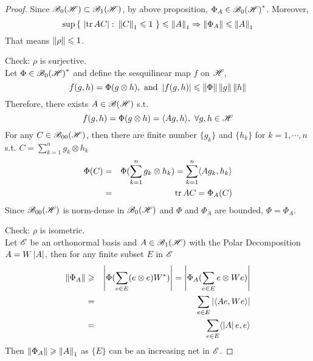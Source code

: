 \documentclass[a4paper,11pt]{report}
\begin{document}
\begin{proof}
	Since $\mathscr{B}_{0}\mathscr{(H)} \subset \mathscr{B}_{1}\mathscr{(H)}$, by above proposition, $\Phi_A \in \mathscr{B}_{0}\mathscr{(H)}^{*}$. Moreover, 
	\begin{equation*}
		\sup{\{~\left\lvert\operatorname{tr}{AC}\right\lvert \colon \left\lVert C\right\lVert_1 \leqslant 1~\}} \leqslant \left\lVert A\right\lVert_1 \Rightarrow  \left\lVert\Phi_A\right\lVert \leqslant \left\lVert A\right\lVert_1
	\end{equation*}
	That means $\left\lVert\rho\right\lVert \leqslant 1$.
	\item Check: $\rho$ is surjective.\\
	Let $\Phi \in \mathscr{B}_{0}\mathscr{(H)}^{*}$ and define the sesquilinear map $f$ on $\mathscr{H}$,
	\begin{equation*}
		f(g,h) = \Phi(g \otimes h), \text{ and } \left\lvert f(g,h)\right\lvert \leqslant \left\lVert\Phi\right\lVert\left\lVert g\right\lVert\left\lVert h\right\lVert
	\end{equation*}
	Therefore, there exists $A \in \mathscr{B(H)}$ s.t.
	\begin{equation*}
		f(g,h) = \Phi(g \otimes h) = \langle Ag, h \rangle,~\forall g,h \in \mathscr{H}
	\end{equation*}
	For any $C \in \mathscr{B}_{00}\mathscr{(H)}$, then there are finite number $\{g_k\}$ and $\{h_k\}$ for $k=1,\cdots,n$ s.t. $C = \sum_{k=1}^{n} g_k \otimes h_k$
	\begin{eqnarray*}
		\Phi(C) &=& \Phi(\sum_{k=1}^{n} g_k \otimes h_k) = \sum_{k=1}^{n} \langle A g_k , h_k \rangle \\
		&=& \operatorname{tr}{AC} = \Phi_A(C)
	\end{eqnarray*}
	Since $\mathscr{B}_{00}\mathscr{(H)}$ is norm-dense in $\mathscr{B}_{0}\mathscr{(H)}$ and $\Phi$ and $\Phi_A$ are bounded, $\Phi = \Phi_A$.
	\item Check: $\rho$ is isometric.\\
	Let $\mathscr{E}$ be an orthonormal basis and $A \in \mathscr{B}_{1}\mathscr{(H)}$ with the Polar Decomposition $A = W\left\lvert A\right\lvert$, then for any finite subset $E$ in $\mathscr{E}$
	\begin{eqnarray*}
		\left\lVert\Phi_A\right\lVert &\geqslant& \left\lvert\Phi(\sum_{e \in E}(e \otimes e)W^{*})\right\lvert = \left\lvert\Phi_A(\sum_{e \in E}e \otimes We)\right\lvert \\
		&=& \sum_{e \in E} \left\lvert\langle Ae,We \rangle\right\lvert \\
		&=& \sum_{e \in E} \langle \left\lvert A\right\lvert e, e \rangle
	\end{eqnarray*}
	Then $\left\lVert\Phi_A\right\lVert \geqslant \left\lVert A\right\lVert_1$ as $\{E\}$ can be an increasing net in $\mathscr{E}$.
\end{proof}
\end{document}
